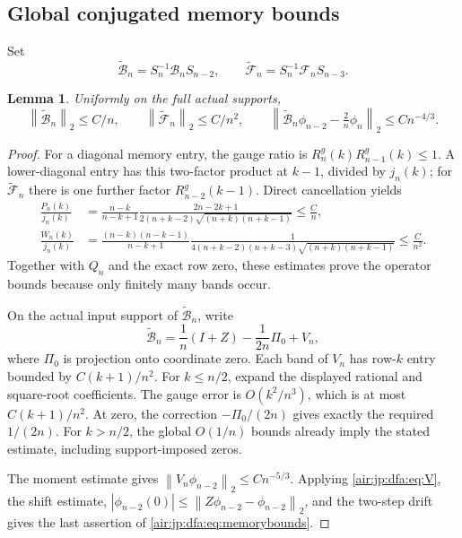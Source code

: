 \documentclass[11pt,letterpaper]{article}
\numberwithin{equation}{section}
\newtheorem{lemma}[theorem]{Lemma}
\theoremstyle{remark}
\newcommand{\normtwo}[1]{\left\lVert#1\right\rVert_2}
\begin{document}
\subsection{Global conjugated memory bounds}
Set
\[
 \widetilde{\mathcal B}_n=S_n^{-1}\mathcal B_nS_{n-2},\qquad
 \widetilde{\mathcal F}_n=S_n^{-1}\mathcal F_nS_{n-3}.
\]
\begin{lemma}\label{air:jp:dfa:lem:memorybounds}
Uniformly on the full actual supports,
\begin{equation}\label{air:jp:dfa:eq:memorybounds}
 \normtwo{\widetilde{\mathcal B}_n}\le C/n,\qquad
 \normtwo{\widetilde{\mathcal F}_n}\le C/n^2,\qquad
 \normtwo{\widetilde{\mathcal B}_n\phi_{n-2}-\tfrac2n\phi_n}\le Cn^{-4/3}.
\end{equation}
\end{lemma}
\begin{proof}
For a diagonal memory entry, the gauge ratio is $R_n^g(k)R_{n-1}^g(k)\le1$. A lower-diagonal entry has this two-factor product at $k-1$, divided by $j_n(k)$; for $\widetilde{\mathcal F}_n$ there is one further factor $R_{n-2}^g(k-1)$. Direct cancellation yields
\begin{align*}
 \frac{P_n(k)}{j_n(k)}
 &=\frac{n-k}{n-k+1}\frac{2n-2k+1}
 {2(n+k-2)\sqrt{(n+k)(n+k-1)}}\le\frac Cn,\\
 \frac{W_n(k)}{j_n(k)}
 &=\frac{(n-k)(n-k-1)}{n-k+1}
 \frac1{4(n+k-2)(n+k-3)\sqrt{(n+k)(n+k-1)}}\le\frac C{n^2}.
\end{align*}
Together with $Q_n$ and the exact row zero, these estimates prove the operator bounds because only finitely many bands occur.

On the actual input support of $\widetilde{\mathcal B}_n$, write
\begin{equation}\label{air:jp:dfa:eq:V}
 \widetilde{\mathcal B}_n=\frac1n(I+Z)-\frac1{2n}\Pi_0+V_n,
\end{equation}
where $\Pi_0$ is projection onto coordinate zero. Each band of $V_n$ has row-$k$ entry bounded by $C(k+1)/n^2$. For $k\le n/2$, expand the displayed rational and square-root coefficients. The gauge error is $O(k^2/n^3)$, which is at most $C(k+1)/n^2$. At zero, the correction $-\Pi_0/(2n)$ gives exactly the required $1/(2n)$. For $k>n/2$, the global $O(1/n)$ bounds already imply the stated estimate, including support-imposed zeros.

The moment estimate gives $\normtwo{V_n\phi_{n-2}}\le Cn^{-5/3}$. Applying \eqref{air:jp:dfa:eq:V}, the shift estimate, $|\phi_{n-2}(0)|\le\normtwo{Z\phi_{n-2}-\phi_{n-2}}$, and the two-step drift gives the last assertion of \eqref{air:jp:dfa:eq:memorybounds}.
\end{proof}
\end{document}
